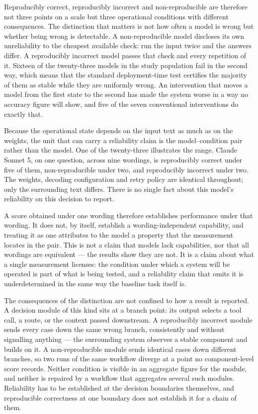 Reproducibly correct, reproducibly incorrect and non-reproducible are therefore not
three points on a scale but three operational conditions with different consequences.
The distinction that matters is not how often a model is wrong but whether being
wrong is detectable. A non-reproducible model discloses its own unreliability to
the cheapest available check: run the input twice and the answers differ. A
reproducibly incorrect model passes that check and every repetition of it. Sixteen
of the twenty-three models in the study population fail in the second way, which
means that the standard deployment-time test certifies the majority of them as
stable while they are uniformly wrong. An intervention that moves a model from the
first state to the second has made the system worse in a way no accuracy figure
will show, and five of the seven conventional interventions do exactly that.

Because the operational state depends on the input text as much as on the weights,
the unit that can carry a reliability claim is the model--condition pair rather than
the model. One of the twenty-three illustrates the range. Claude Sonnet 5, on one
question, across nine wordings, is reproducibly correct under five of them,
non-reproducible under two, and reproducibly incorrect under two. The weights,
decoding configuration and retry policy are identical throughout; only the
surrounding text differs. There is no single fact about this model's reliability on
this decision to report.

A score obtained under one wording therefore establishes performance under that
wording. It does not, by itself, establish a wording-independent capability, and
treating it as one attributes to the model a property that the measurement locates
in the pair. This is not a claim that models lack capabilities, nor that all
wordings are equivalent --- the results show they are not. It is a claim about what a
single measurement licenses: the condition under which a system will be operated is
part of what is being tested, and a reliability claim that omits it is
underdetermined in the same way the baseline task itself is.


The consequences of the distinction are not confined to how a result is reported. A
decision module of this kind sits at a branch point: its output selects a tool call,
a route, or the context passed downstream. A reproducibly incorrect module sends
every case down the same wrong branch, consistently and without signalling
anything --- the surrounding system observes a stable component and builds on it. A
non-reproducible module sends identical cases down different branches, so two runs
of the same workflow diverge at a point no component-level score records. Neither
condition is visible in an aggregate figure for the module, and neither is repaired
by a workflow that aggregates several such modules. Reliability has to be
established at the decision boundaries themselves, and reproducible correctness at
one boundary does not establish it for a chain of them.

